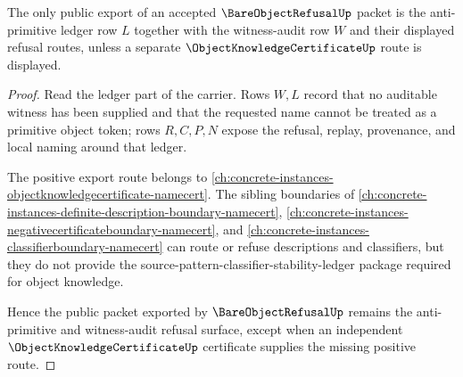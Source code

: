 \begin{theorem}
\label{thm:bare-object-refusal-obligation-ledger}
The only public export of an accepted $\BareObjectRefusalUp$ packet is the anti-primitive ledger row $L$ together with the witness-audit row $W$ and their displayed refusal routes, unless a separate $\ObjectKnowledgeCertificateUp$ route is displayed.
\end{theorem}
\begin{proof}
Read the ledger part of the carrier. Rows $W,L$ record that no auditable witness has been supplied and that the requested name cannot be treated as a primitive object token; rows $R,C,P,N$ expose the refusal, replay, provenance, and local naming around that ledger.

The positive export route belongs to \autoref{ch:concrete-instances-objectknowledgecertificate-namecert}. The sibling boundaries of \autoref{ch:concrete-instances-definite-description-boundary-namecert}, \autoref{ch:concrete-instances-negativecertificateboundary-namecert}, and \autoref{ch:concrete-instances-classifierboundary-namecert} can route or refuse descriptions and classifiers, but they do not provide the source-pattern-classifier-stability-ledger package required for object knowledge.

Hence the public packet exported by $\BareObjectRefusalUp$ remains the anti-primitive and witness-audit refusal surface, except when an independent $\ObjectKnowledgeCertificateUp$ certificate supplies the missing positive route.
\end{proof}


